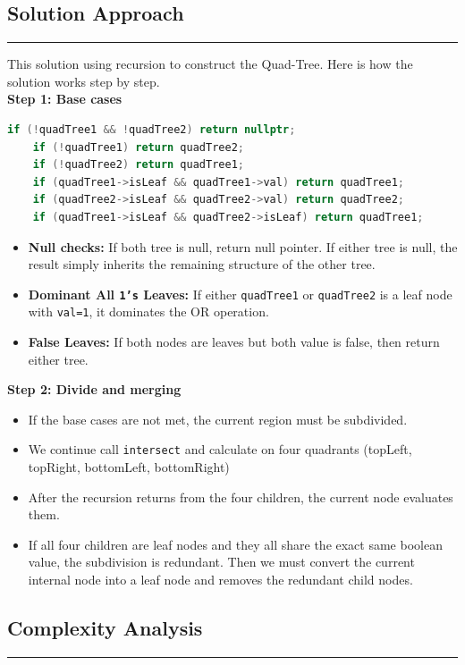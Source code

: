 \subsection*{Solution Approach}
\vspace{-1.5em}
\noindent\rule{\textwidth}{0.4pt}

This solution using recursion to construct the Quad-Tree. Here is how the solution works step by step.\\
\textbf{Step 1: Base cases}
\begin{lstlisting}[language=C++,linewidth=\linewidth]
	if (!quadTree1 && !quadTree2) return nullptr;
	if (!quadTree1) return quadTree2;
	if (!quadTree2) return quadTree1;
	if (quadTree1->isLeaf && quadTree1->val) return quadTree1;
	if (quadTree2->isLeaf && quadTree2->val) return quadTree2;
	if (quadTree1->isLeaf && quadTree2->isLeaf) return quadTree1;
\end{lstlisting}
\begin{itemize}
    \item \textbf{Null checks:} If both tree is null, return null pointer. If either tree is null, the result simply inherits the remaining structure of the other tree.
    \item \textbf{Dominant All \texttt{1's} Leaves:} If either \texttt{quadTree1} or \texttt{quadTree2} is a leaf node with \texttt{val=1}, it dominates the OR operation. 
    \item \textbf{False Leaves:} If both nodes are leaves but both value is false, then return either tree.
\end{itemize}
\textbf{Step 2: Divide and merging}
\begin{itemize}
    \item If the base cases are not met, the current region must be subdivided.
    \item We continue call \texttt{intersect} and calculate on four quadrants (topLeft, topRight, bottomLeft, bottomRight)
    \item After the recursion returns from the four children, the current node evaluates them.
    \item If all four children are leaf nodes and they all share the exact same boolean value, the subdivision is redundant. Then we must convert the current internal node into a leaf node and removes the redundant child nodes.
\end{itemize}

\subsection*{Complexity Analysis}
\vspace{-1.5em}
\noindent\rule{\textwidth}{0.4pt}

